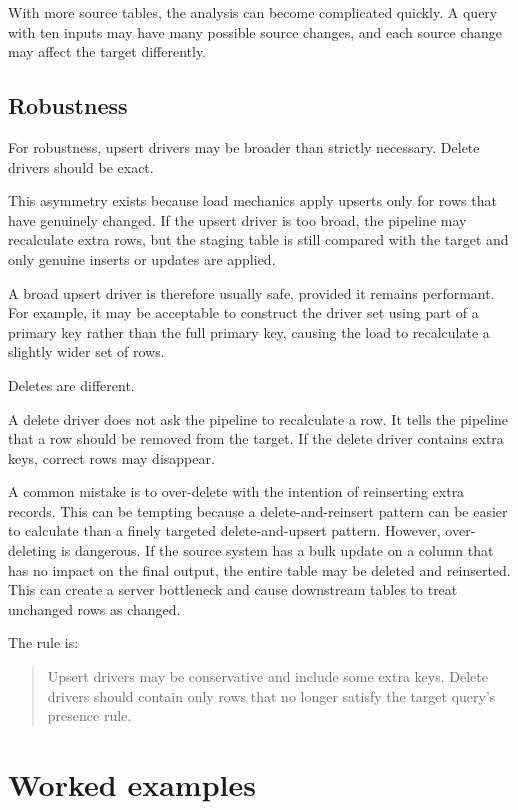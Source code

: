 \documentclass[10pt,openany,10pt]{book}
\begin{document}
With more source tables, the analysis can become complicated quickly. A
query with ten inputs may have many possible source changes, and each
source change may affect the target differently.

\subsection{Robustness}\label{robustness}

For robustness, upsert drivers may be broader than strictly necessary.
Delete drivers should be exact.

This asymmetry exists because load mechanics apply upserts only for rows
that have genuinely changed. If the upsert driver is too broad, the
pipeline may recalculate extra rows, but the staging table is still
compared with the target and only genuine inserts or updates are
applied.

A broad upsert driver is therefore usually safe, provided it remains
performant. For example, it may be acceptable to construct the driver
set using part of a primary key rather than the full primary key,
causing the load to recalculate a slightly wider set of rows.

Deletes are different.

A delete driver does not ask the pipeline to recalculate a row. It tells
the pipeline that a row should be removed from the target. If the delete
driver contains extra keys, correct rows may disappear.

A common mistake is to over-delete with the intention of reinserting
extra records. This can be tempting because a delete-and-reinsert
pattern can be easier to calculate than a finely targeted
delete-and-upsert pattern. However, over-deleting is dangerous. If the
source system has a bulk update on a column that has no impact on the
final output, the entire table may be deleted and reinserted. This can
create a server bottleneck and cause downstream tables to treat
unchanged rows as changed.

The rule is:

\begin{quote}
Upsert drivers may be conservative and include some extra keys. Delete
drivers should contain only rows that no longer satisfy the target
query's presence rule.
\end{quote}

\section{Worked examples}\label{worked-examples}
\end{document}

